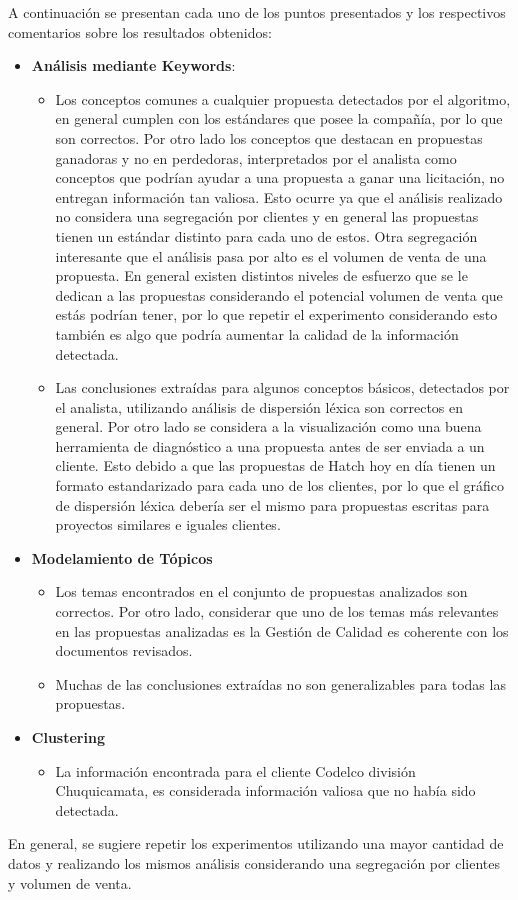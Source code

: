     A continuación se presentan cada uno de los puntos presentados y los respectivos comentarios sobre los resultados obtenidos:
    
    \begin{itemize}
        \item \textbf{Análisis mediante Keywords}:
        \begin{itemize}
            \item Los conceptos comunes a cualquier propuesta detectados por el algoritmo, en general cumplen con los estándares que posee la compañía, por lo que son correctos. Por otro lado los conceptos que destacan en propuestas ganadoras y no en perdedoras, interpretados por el analista como conceptos que podrían ayudar a una propuesta a ganar una licitación,  no entregan información tan valiosa. Esto ocurre ya que el análisis realizado no considera una segregación por clientes y en general las propuestas tienen un estándar distinto para cada uno de estos. Otra segregación interesante que el análisis pasa por alto es el volumen de venta de una propuesta. En general existen distintos niveles de esfuerzo que se le dedican a las propuestas considerando el potencial volumen de venta que estás podrían tener, por lo que repetir el experimento considerando esto también es algo que podría aumentar la calidad de la información detectada.
            
            \item Las conclusiones extraídas para algunos conceptos básicos, detectados por el analista, utilizando análisis de dispersión léxica son correctos en general. Por otro lado se considera a la visualización como una buena herramienta de diagnóstico a una propuesta antes de ser enviada a un cliente. Esto debido a que las propuestas de Hatch hoy en día tienen un formato estandarizado para cada uno de los clientes, por lo que el gráfico de dispersión léxica debería ser el mismo para propuestas escritas para proyectos similares e iguales clientes. 
        \end{itemize}
        \item \textbf{Modelamiento de Tópicos }
        \begin{itemize}
            \item Los temas encontrados en el conjunto de propuestas analizados son correctos. Por otro lado, considerar que uno de los temas más relevantes en las propuestas analizadas es la Gestión de Calidad es coherente con los documentos revisados.
            \item Muchas de las conclusiones extraídas no son generalizables para todas las propuestas.
        \end{itemize}
        \item \textbf{Clustering}
        \begin{itemize}
            \item La información encontrada para el cliente Codelco división Chuquicamata, es considerada información valiosa que no había sido detectada.
        \end{itemize}
    \end{itemize}
    En general, se sugiere repetir los experimentos utilizando una mayor cantidad de datos y realizando los mismos análisis considerando una segregación por clientes y volumen de venta.
